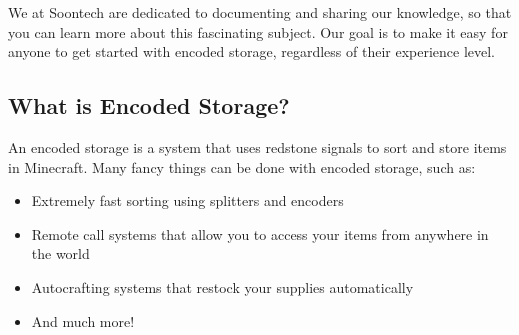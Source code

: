 \documentclass[10pt]{datasheet2}
\begin{document}
We at Soontech are dedicated to documenting and sharing our knowledge, so that you can learn more about this fascinating subject. Our goal is to make it easy for anyone to get started with encoded storage, regardless of their experience level.

\subsection{What is Encoded Storage?}

An encoded storage is a system that uses redstone signals to sort and store items in Minecraft. Many fancy things can be done with encoded storage, such as:

\begin{itemize}
    \item Extremely fast sorting using splitters and encoders
    \item Remote call systems that allow you to access your items from anywhere in the world
    \item Autocrafting systems that restock your supplies automatically
    \item And much more!
\end{itemize}
\end{document}
